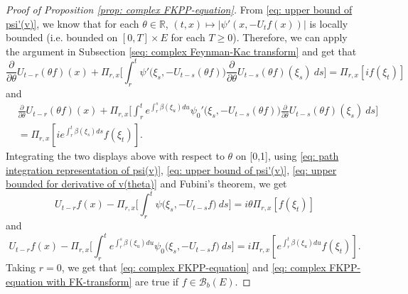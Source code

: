 \documentclass[12pt]{amsart}
\theoremstyle{plain}
\theoremstyle{definition}
\numberwithin{equation}{section}
\begin{document}
\begin{proof}[Proof of Proposition \ref{prop: complex FKPP-equation}]
    From \eqref{eq: upper bound of psi'(v)}, we know that for each $\theta\in \mathbb R$, $(t,x) \mapsto |\psi'(x,-U_tf(x))|$ is locally bounded (i.e. bounded on $[0,T]\times E$ for each $T \geq 0$).
    Therefore, we can apply the argument in Subsection \ref{seq: complex Feynman-Kac transform} and get that
\[
    \frac{\partial}{\partial \theta} U_{t-r}(\theta f)(x) + \Pi_{r,x} \Big[\int_r^t \psi'\big(\xi_s,- U_{t-s}(\theta f)\big)\frac{\partial}{\partial \theta} U_{t-s}(\theta f)(\xi_s)~ds\Big]
    = \Pi_{r,x} [i f(\xi_t)]
\]
    and
\begin{align}
    &\frac{\partial}{\partial \theta} U_{t-r}(\theta f)(x) + \Pi_{r,x} \Big[\int_r^t e^{\int_r^s \beta(\xi_u)du}\psi_0'\big(\xi_s,- U_{t-s}(\theta f)\big)\frac{\partial}{\partial \theta} U_{t-s}(\theta f)(\xi_s)~ds\Big]\\
    &= \Pi_{r,x} [i e^{\int_r^t \beta(\xi_s)ds}f(\xi_t)].
\end{align}
    Integrating the two displays above with respect to $\theta$  on [0,1], using \eqref{eq: path integration representation of psi(v)}, \eqref{eq: upper bound of psi'(v)}, \eqref{eq: upper bounded for derivative of v(theta)} and Fubini's theorem, we get
\begin{equation}
    U_{t-r}f(x) - \Pi_{r,x} \Big[\int_r^t \psi\big(\xi_s,-U_{t-s}f\big) ~ds\Big]
    = i\theta \Pi_{r,x} [f(\xi_t)]
\end{equation}
    and 
\begin{equation}
    U_{t-r}f(x) - \Pi_{r,x} \Big[\int_r^t e^{\int_r^s \beta(\xi_u)du} \psi_0\big(\xi_s,- U_{t-s}f\big) ~ds\Big]
    = i\Pi_{r,x} [e^{\int_r^t\beta(\xi_u)du}f(\xi_t)].
\end{equation}
    Taking $r = 0$, we get that \eqref{eq: complex FKPP-equation} and \eqref{eq: complex FKPP-equation with FK-transform} are true if $f\in \mathcal B_b(E)$.


\end{proof}
\end{document}
